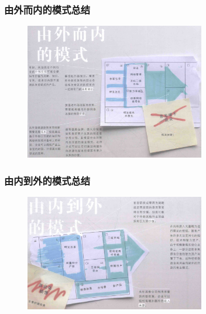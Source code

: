     \subsubsection{由外而内的模式总结}
    \begin{figure}[H]
		\centering
        \vspace{-0.5em}
		\includegraphics[width=0.7\textwidth]{img/由外而内的模式.png}
        \vspace{-0.5em}
	\end{figure}
    
    \subsubsection{由内到外的模式总结}
    \begin{figure}[H]
		\centering
        \vspace{-0.5em}
		\includegraphics[width=0.7\textwidth]{img/由内到外的模式.png}
        \vspace{-0.5em}
	\end{figure}


